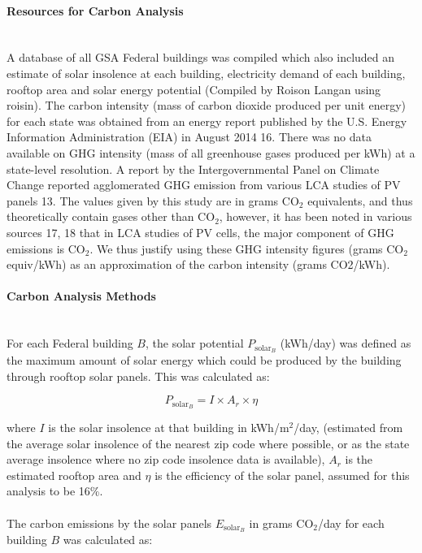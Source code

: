 \paragraph{Resources for Carbon Analysis} \mbox{ }\\
A database of all GSA Federal buildings was compiled which also included an estimate of solar insolence at each building, electricity demand of each building, rooftop area and solar energy potential (Compiled by Roison Langan using \cite{debbie}{roisin}). The carbon intensity (mass of carbon dioxide produced per unit energy) for each state was obtained from an energy report published by the U.S. Energy Information Administration (EIA) in August 2014 \cite{debbie}{16}. There was no data available on GHG intensity (mass of all greenhouse gases produced per kWh) at a state-level resolution. A report by the Intergovernmental Panel on Climate Change reported agglomerated GHG emission from various LCA studies of PV panels \cite{debbie}{13}. The values given by this study are in grams CO$_{2}$ equivalents, and thus theoretically contain gases other than CO$_{2}$, however, it has been noted in various sources \cite{debbie}{17, 18} that in LCA studies of PV cells, the major component of GHG emissions is CO$_{2}$. We thus justify using these GHG intensity figures (grams CO$_{2}$ equiv/kWh) as an approximation of the carbon intensity (grams CO2/kWh).

\paragraph{Carbon Analysis Methods} \mbox{ }\\
For each Federal building $B$, the solar potential $P_{{\mbox{solar}}_{B}}$ (kWh/day) was defined as the maximum amount of solar energy which could be produced by the building through rooftop solar panels. This was calculated as:

\begin{equation}
P_{{\mbox{solar}}_{B}} = I \times A_{r} \times \eta
\end{equation}

\noindent where $I$ is the solar insolence at that building in kWh/m$^{2}$/day, (estimated from the average solar insolence of the nearest zip code where possible, or as the state average insolence where no zip code insolence data is available), $A_{r}$ is the estimated rooftop area and $\eta$ is the efficiency of the solar panel, assumed for this analysis to be 16\%.
\\\\
\noindent The carbon emissions by the solar panels $E_{{\mbox{solar}}_{B}}$ in grams CO$_{2}$/day for each building $B$ was calculated as:

